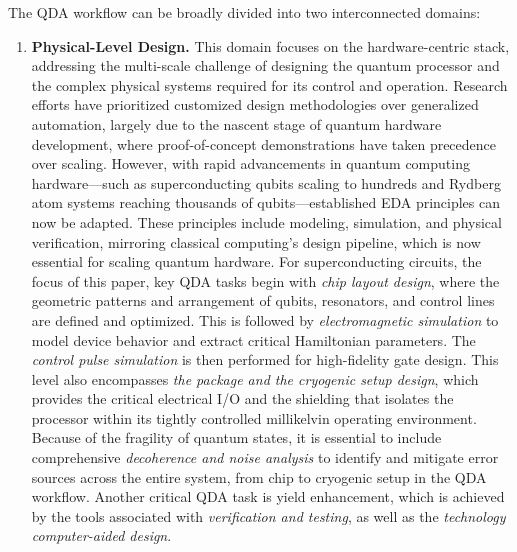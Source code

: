 \documentclass[a4paper,onecolumn,11pt,unpublished]{quantumarticle}
\begin{document}
The QDA workflow can be broadly divided into two interconnected domains:

\begin{enumerate}
\item \textbf{Physical-Level Design.}
This domain focuses on the hardware-centric stack, addressing the multi-scale challenge of designing the quantum processor and the complex physical systems required for its control and operation. 
Research efforts have prioritized customized design methodologies over generalized automation, largely due to the nascent stage of quantum hardware development, where proof-of-concept demonstrations have taken precedence over scaling.
However, with rapid advancements in quantum computing hardware---such as superconducting qubits scaling to hundreds and Rydberg atom systems reaching thousands of qubits---established EDA principles can now be adapted.
These principles include modeling, simulation, and physical verification, mirroring classical computing's design pipeline, which is now essential for scaling quantum hardware.
For superconducting circuits, the focus of this paper, key QDA tasks begin with \textit{chip layout design}, where the geometric patterns and arrangement of qubits, resonators, and control lines are defined and optimized. 
This is followed by \textit{electromagnetic simulation} to model device behavior and extract critical Hamiltonian parameters. The \textit{control pulse simulation} is then performed for high-fidelity gate design.
This level also encompasses \textit{the package and the cryogenic setup design}, which provides the critical electrical I/O and the shielding that isolates the processor within its tightly controlled millikelvin operating environment. 
Because of the fragility of quantum states, it is essential to include comprehensive \textit{decoherence and noise analysis} to identify and mitigate error sources across the entire system, from chip to cryogenic setup in the QDA workflow. Another critical QDA task is yield enhancement, which is achieved by the tools associated with \textit{verification and testing}, as well as the \textit{technology computer-aided design}. 


\end{enumerate}
\end{document}
